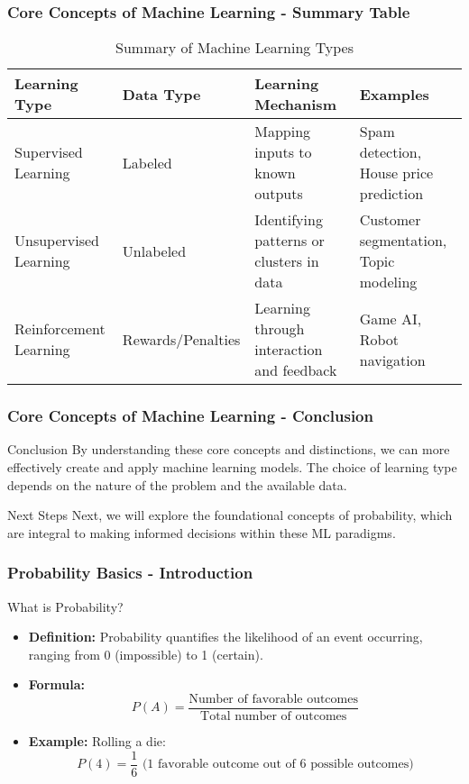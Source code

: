 \documentclass{beamer}
\begin{document}
\begin{frame}[fragile]
    \frametitle{Core Concepts of Machine Learning - Summary Table}
    \begin{table}[ht]
        \centering
        \begin{tabular}{|l|l|l|l|}
            \hline
            \textbf{Learning Type} & \textbf{Data Type} & \textbf{Learning Mechanism} & \textbf{Examples} \\
            \hline
            Supervised Learning & Labeled & Mapping inputs to known outputs & Spam detection, House price prediction \\
            \hline
            Unsupervised Learning & Unlabeled & Identifying patterns or clusters in data & Customer segmentation, Topic modeling \\
            \hline
            Reinforcement Learning & Rewards/Penalties & Learning through interaction and feedback & Game AI, Robot navigation \\
            \hline
        \end{tabular}
        \caption{Summary of Machine Learning Types}
    \end{table}
\end{frame}

\begin{frame}[fragile]
    \frametitle{Core Concepts of Machine Learning - Conclusion}
    \begin{block}{Conclusion}
        By understanding these core concepts and distinctions, we can more effectively create and apply machine learning models. The choice of learning type depends on the nature of the problem and the available data.
    \end{block}
    
    \begin{block}{Next Steps}
        Next, we will explore the foundational concepts of probability, which are integral to making informed decisions within these ML paradigms.
    \end{block}
\end{frame}

\begin{frame}[fragile]
    \frametitle{Probability Basics - Introduction}
    \begin{block}{What is Probability?}
        \begin{itemize}
            \item \textbf{Definition:} Probability quantifies the likelihood of an event occurring, ranging from 0 (impossible) to 1 (certain).
            \item \textbf{Formula:} 
            \[
            P(A) = \frac{\text{Number of favorable outcomes}}{\text{Total number of outcomes}}
            \]
            \item \textbf{Example:} Rolling a die:
            \[
            P(4) = \frac{1}{6} \text{ (1 favorable outcome out of 6 possible outcomes)}
            \]
        \end{itemize}
    \end{block}
\end{frame}
\end{document}
